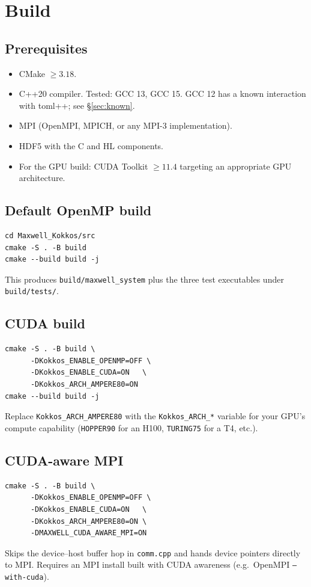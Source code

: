 \documentclass[11pt]{article}
\begin{document}
\section{Build}
\label{sec:build}

\subsection{Prerequisites}

\begin{itemize}[itemsep=2pt,topsep=2pt]
  \item CMake $\geq 3.18$.
  \item C++20 compiler.  Tested: GCC 13, GCC 15.  GCC 12 has a
        known interaction with toml++; see
        \S\ref{sec:known}.
  \item MPI (OpenMPI, MPICH, or any MPI-3 implementation).
  \item HDF5 with the C and HL components.
  \item For the GPU build: CUDA Toolkit $\geq 11.4$ targeting an
        appropriate GPU architecture.
\end{itemize}

\subsection{Default OpenMP build}
\begin{lstlisting}[style=shell]
cd Maxwell_Kokkos/src
cmake -S . -B build
cmake --build build -j
\end{lstlisting}
This produces \texttt{build/maxwell\_system} plus the three test
executables under \texttt{build/tests/}.

\subsection{CUDA build}
\begin{lstlisting}[style=shell]
cmake -S . -B build \
      -DKokkos_ENABLE_OPENMP=OFF \
      -DKokkos_ENABLE_CUDA=ON   \
      -DKokkos_ARCH_AMPERE80=ON
cmake --build build -j
\end{lstlisting}
Replace \texttt{Kokkos\_ARCH\_AMPERE80} with the
\texttt{Kokkos\_ARCH\_*} variable for your GPU's compute capability
(\texttt{HOPPER90} for an H100, \texttt{TURING75} for a T4, etc.).

\subsection{CUDA-aware MPI}
\begin{lstlisting}[style=shell]
cmake -S . -B build \
      -DKokkos_ENABLE_OPENMP=OFF \
      -DKokkos_ENABLE_CUDA=ON   \
      -DKokkos_ARCH_AMPERE80=ON \
      -DMAXWELL_CUDA_AWARE_MPI=ON
\end{lstlisting}
Skips the device--host buffer hop in \texttt{comm.cpp} and hands
device pointers directly to MPI.  Requires an MPI install built
with CUDA awareness (e.g.\ OpenMPI \texttt{--with-cuda}).
\end{document}
